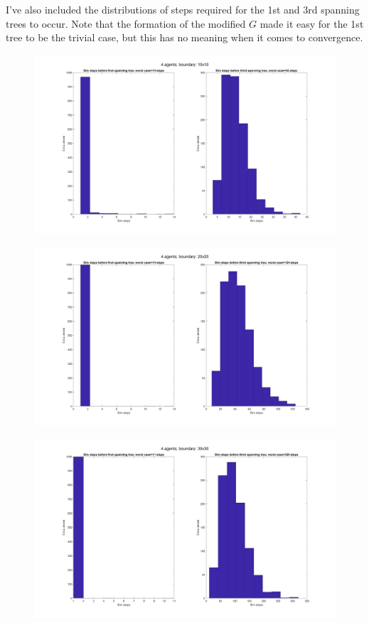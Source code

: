 \documentclass[12pt]{article}
\begin{document}
I've also included the distributions of steps required for the 1st and 3rd spanning trees to occur. Note that the formation of the modified $G$ made it easy for the 1st tree to be the trivial case, but this has no meaning when it comes to convergence.

\begin{figure}[H]
	\includegraphics[width=\textwidth]{square10_4agent_5trees_stree_steps.png}
	\centering
\end{figure}

\begin{figure}[H]
	\includegraphics[width=\textwidth]{square20_4agent_5trees_stree_steps.png}
	\centering
\end{figure}

\begin{figure}[H]
	\includegraphics[width=\textwidth]{square30_4agent_5trees_stree_steps.png}
	\centering
\end{figure}
\end{document}
